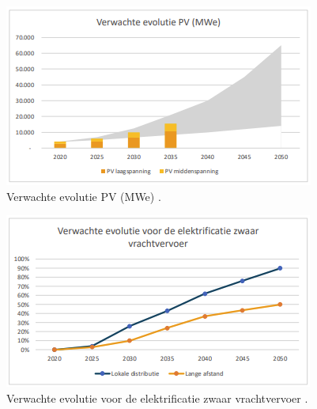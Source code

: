 \documentclass{hogent-article}
\begin{document}
\begin{figure}
    \centering\includegraphics[scale=0.5]{img/Evolutie_PV}
    \caption{\label{fig:Evolutie_PV}Verwachte evolutie PV (MWe) \autocite{Verdoodt2022}.}
\end{figure}

\begin{figure}
    \centering\includegraphics[scale=0.5]{img/El_Vrachtvervoer}
    \caption{\label{fig:El_Vrachtvervoer}Verwachte evolutie voor de elektrificatie zwaar
        vrachtvervoer \autocite{Verdoodt2022}.}
\end{figure}
\end{document}
